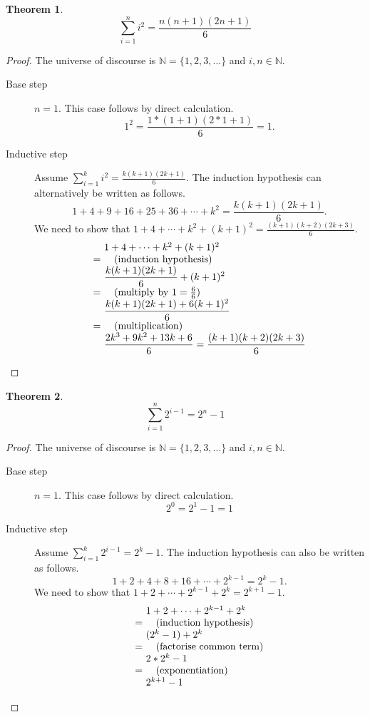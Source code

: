 \documentclass[a4paper,11pt]{article}
\makeatletter
\theoremstyle{plain}
\newtheorem{theorem}{Theorem}[section]
\theoremstyle{definition}
\newcommand{\ba}{\begin{array}}
\newcommand{\ea}{\end{array}}
\newenvironment{derivation}{\begin{displaymath}\ba{@{}r@{~}l@{}}}{\ea\end{displaymath}\ignorespacesafterend}
\newcommand{\reason}[1]{\quad (\text{#1})}
\makeatother
\begin{document}
\begin{theorem}
  \[
    \displaystyle\sum_{i=1}^ni^2 = \frac{n(n + 1)(2n + 1)}{6}
  \]
\end{theorem}
\begin{proof}
  The universe of discourse is $\mathbb{N} = \{1,2,3,\dots\}$ and $i,n\in\mathbb{N}$.
  \begin{description}
  \item[Base step] $n = 1$. This case follows by direct calculation.
    \[
      1^2 = \frac{1*(1 + 1)(2 * 1 + 1)}{6} = 1.
    \]
  \item[Inductive step] Assume
    $\sum_{i = 1}^ki^2 = \frac{k(k + 1)(2k + 1)}{6}$. The induction
    hypothesis can alternatively be written as follows.
    \[
      \displaystyle 1+4+9+16+25+36+\cdots+k^2 = \frac{k(k+1)(2k+1)}{6}.
    \]
    We need to show that $1+4+\cdots+k^2+(k + 1)^2 = \frac{(k+1)(k+2)(2k+3)}{6}$.
    \begin{derivation}
      &1+4+\cdots+k^2+(k+1)^2\\
      =& \reason{induction hypothesis}\\
      &\displaystyle\frac{k(k+1)(2k+1)}{6} + (k+1)^2\\
      =& \reason{multiply by $1 = \frac{6}{6}$}\\
      &\displaystyle\frac{k(k+1)(2k+1)+6(k+1)^2}{6}\\
      =& \reason{multiplication}\\
      &\displaystyle\frac{2k^3+9k^2+13k+6}{6} = \frac{(k+1)(k+2)(2k+3)}{6}\\
    \end{derivation}
  \end{description}
\end{proof}

\begin{theorem}
  \[
    \displaystyle\sum_{i=1}^n2^{i-1} = 2^n-1
  \]
\end{theorem}
\begin{proof}
  The universe of discourse is $\mathbb{N} = \{1,2,3,\dots\}$ and $i,n\in\mathbb{N}$.
  \begin{description}
  \item[Base step] $n = 1$. This case follows by direct calculation.
    \[
      2^0 = 2^1 - 1 = 1
    \]
  \item[Inductive step] Assume $\sum_{i = 1}^k2^{i-1} = 2^k - 1$. The
    induction hypothesis can also be written as follows.
    \[
      1 + 2 + 4 + 8 + 16 + \cdots + 2^{k-1} = 2^k - 1.
    \]
    We need to show that $1+2+\cdots+2^{k-1}+2^k = 2^{k+1} - 1$.
    \begin{derivation}
      &1+2+\cdots+2^{k-1}+2^k\\
      =& \reason{induction hypothesis}\\
      &(2^k - 1) + 2^k\\
      =& \reason{factorise common term}\\
      & 2*2^k - 1\\
      =& \reason{exponentiation}\\
      &2^{k+1} - 1
    \end{derivation}
  \end{description}
\end{proof}
\end{document}
